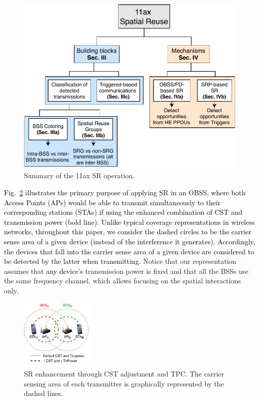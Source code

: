\documentclass{ieeeaccess}
\begin{document}
\begin{figure}[ht!]
	\centering
	\includegraphics[width=\columnwidth]{sr_summary}
	\caption{Summary of the 11ax SR operation.}
	\label{fig:sr_summary}
\end{figure}

\textcolor{black}{Fig.~\ref{fig:spatial_reuse_11ax} illustrates the primary purpose of applying SR in an OBSS, where both Access Points (APs) would be able to transmit simultaneously to their corresponding stations (STAs) if using the enhanced combination of CST and transmission power (bold line). Unlike typical coverage representations in wireless networks, throughout this paper, we consider the dashed circles to be the carrier sense area of a given device (instead of the interference it generates). Accordingly, the devices that fall into the carrier sense area of a given device are considered to be detected by the latter when transmitting.} Notice that our representation assumes that \textcolor{black}{any device's} transmission power is fixed and that all the BSSs use the same frequency channel, which allows focusing on the spatial interactions only. 
\begin{figure}[ht!]
	\centering
	\includegraphics[width=0.33\textwidth]{fig_1.pdf}
	\caption{SR enhancement through CST adjustment and TPC. The carrier sensing area of each transmitter is graphically represented by the dashed lines.}
	\label{fig:spatial_reuse_11ax}
\end{figure}
\end{document}
